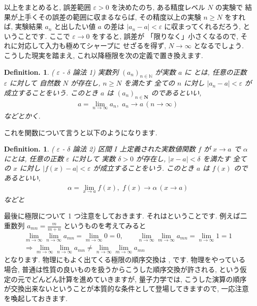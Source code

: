\documentclass[openany, a4paper, oneside]{book}
\theoremstyle{break}
\theoremstyle{breakdefn}
\newtheorem{defn}[thm]{Definition.}
\newcommand{\vep}{\varepsilon}
\begin{document}
以上をまとめると,
誤差範囲 $\varepsilon >0$ を決めたのち, ある精度レベル $N$ の実験で
結果が上手くその誤差の範囲に収まるならば,
その精度以上の実験 $n \geq N$ をすれば, 実験結果 $a_n$ と出したい値 $a$
の差は $|a_n -a| < \varepsilon$ に収まってくれるだろう,
ということです.
ここで $\varepsilon \to 0$ をすると, 誤差が
「限りなく」小さくなるので, それに対応して入力も極めてシャープに
せざるを得ず,  $N \to \infty$ となるでしょう.
こうした現実を踏まえ, これ以降極限を次の定義で置き換えます.
\begin{defn}( $\vep$ - $\delta$ 論法 1)\index{いぷしろんでるたろんぽう@ $\vep$ - $\delta$ 論法}
実数列 $(a_n)_{n \in \mathbb{N}}$ が実数 $a$ に
とは, 任意の正数 $\varepsilon$ に対して
自然数 $N$ が存在し,  $n\geq N$ を満たす
全ての $n$ に対し $|a_n-a|<\varepsilon$ が成立することをいう.
このとき $a$ は $(a_n)_{n \in \bm{N}}$ のであるといい,
\begin{align}
    a = \lim_{n \to \infty}a_n ,\,\, a_n \to a \, (n \to \infty)
\end{align}
などとかく.
\end{defn}

これを関数について言うと以下のようになります.
\begin{defn}( $\vep$ - $\delta$ 論法 2)
区間 $I$ 上定義された実数値関数 $f$ が $x \to a$
で $\alpha$ にとは, 任意の正数 $\varepsilon$ に対して
実数 $\delta >0$ が存在し,  $|x-a|<\delta$ を満たす
全ての $x$ に対し $|f (x)-a|<\varepsilon$ が成立することをいう.
このとき $a$ は $f (x)$ のであるといい,
\begin{align}
    \alpha = \lim_{x \to a}f (x) ,\,\, f (x) \to \alpha \, (x \to a)
\end{align}
などと
\end{defn}

最後に極限について 1 つ注意をしておきます.
それはということです.
例えば二重数列 $a_{mn}=\frac{m}{m+n}$ というものを考えてみると
    \begin{gather}
        \lim_{m\to\infty} \lim_{n\to\infty}a_{mn}
        =
        \lim_{m\to\infty}0
        =
        0,
        \qquad
        \lim_{n\to\infty} \lim_{m\to\infty}a_{mn}
        =
        \lim_{n\to\infty}1
        =1\\
        \Longrightarrow
        \lim_{m\to\infty} \lim_{n\to\infty}a_{mn}
        \not=
        \lim_{n\to\infty} \lim_{m\to\infty}a_{mn}
    \end{gather}
となります. 物理にもよく出てくる極限の順序交換は
, です.
物理をやっている場合, 普通は性質の良いものを扱うからこうした順序交換が許される, という仮定の元でどんどん計算を進めていきますが,
量子力学では, こうした演算の順序が交換出来ないということが本質的な条件として登場してきますので, 一応注意を喚起しておきます.
\end{document}

